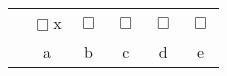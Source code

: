 \begin{center}
\begin{tabular}{c c c c c c}
& $\Box$\hspace{-0.25cm}x  & $\Box$  & $\Box$   & $\Box$   & $\Box$  \\
& a & b  & c  & d  & e \\
\end{tabular}
\end{center}
